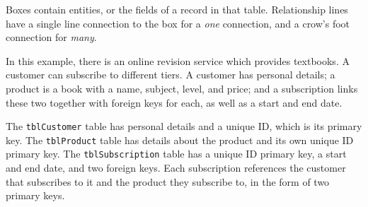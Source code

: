 \documentclass[../main.tex]{subfile}
\begin{document}

Boxes contain entities, or the fields of a record in that table. Relationship lines have a single line connection to the box for a \textit{one} connection, and a crow's foot connection for \textit{many}.

In this example, there is an online revision service which provides textbooks. A customer can subscribe to different tiers. A customer has personal details; a product is a book with a name, subject, level, and price; and a subscription links these two together with foreign keys for each, as well as a start and end date.

\begin{center}
\end{center}

The \texttt{tblCustomer} table has personal details and a unique ID, which is its primary key. The \texttt{tblProduct} table has details about the product and its own unique ID primary key. The \texttt{tblSubscription} table has a unique ID primary key, a start and end date, and two foreign keys. Each subscription references the customer that subscribes to it and the product they subscribe to, in the form of two primary keys.
\end{document}

